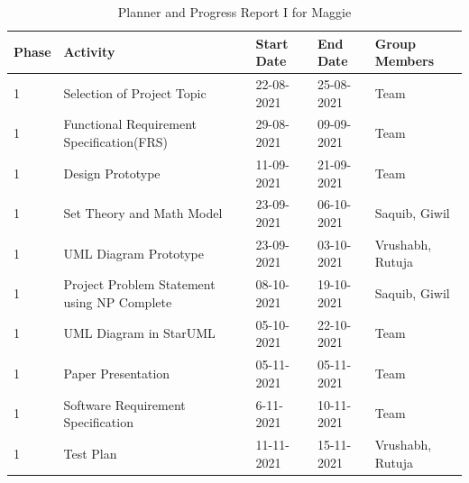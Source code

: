 \documentclass[openany,12pt]{report}
\begin{document}
\newpage
\begin{table} [htb]
\centering
\begin{tabular}{| p{1.2 cm}| p{5 cm}| p{2.5 cm}| p{2.5 cm}| p{3 cm}| }\hline
\textbf{Phase}	&\textbf{Activity}	&\textbf{Start Date}	&\textbf{End Date} &\textbf{Group Members}\\\hline\hline
1 &Selection of Project Topic	&22-08-2021 	&25-08-2021 &Team \\\hline
1 &Functional Requirement Specification(FRS) &29-08-2021 &09-09-2021 &Team\\\hline
1 &Design Prototype &11-09-2021 &21-09-2021 &Team\\\hline
1 &Set Theory and Math Model &23-09-2021 &06-10-2021 & Saquib, Giwil\\\hline
1 &UML Diagram Prototype &23-09-2021 &03-10-2021 &Vrushabh, \newline Rutuja \\\hline
1 &Project Problem Statement using NP Complete &08-10-2021 &19-10-2021 &Saquib, Giwil\\\hline
1 &UML Diagram in StarUML &05-10-2021 &22-10-2021 &Team \\\hline
1 &Paper Presentation &05-11-2021 &05-11-2021 &Team \\\hline
1 &Software Requirement Specification &6-11-2021 &10-11-2021 &Team \\\hline
1 &Test Plan &11-11-2021 &15-11-2021 &Vrushabh, \newline Rutuja \\\hline
\end{tabular}
\caption{Planner and Progress Report I for Maggie}
\label{tab:nnwork}
\end{table}
\end{document}
